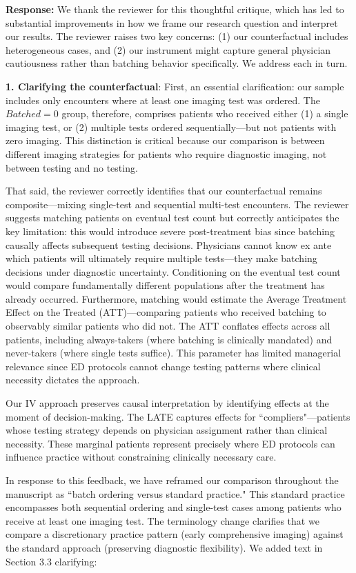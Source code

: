 \documentclass[11pt]{article}
\newcommand{\1}{\hbox{\rm 1\kern-.35em 1}}
\begin{document}
\noindent\textbf{Response:} \color{blue}We thank the reviewer for this thoughtful critique, which has led to substantial improvements in how we frame our research question and interpret our results. The reviewer raises two key concerns: (1) our counterfactual includes heterogeneous cases, and (2) our instrument might capture general physician cautiousness rather than batching behavior specifically. We address each in turn.

\textbf{1. Clarifying the counterfactual}: First, an essential clarification: our sample includes only encounters where at least one imaging test was ordered. The $Batched=0$ group, therefore, comprises patients who received either (1) a single imaging test, or (2) multiple tests ordered sequentially—but not patients with zero imaging. This distinction is critical because our comparison is between different imaging strategies for patients who require diagnostic imaging, not between testing and no testing.

That said, the reviewer correctly identifies that our counterfactual remains composite—mixing single-test and sequential multi-test encounters. The reviewer suggests matching patients on eventual test count but correctly anticipates the key limitation: this would introduce severe post-treatment bias since batching causally affects subsequent testing decisions. Physicians cannot know ex ante which patients will ultimately require multiple tests—they make batching decisions under diagnostic uncertainty. Conditioning on the eventual test count would compare fundamentally different populations after the treatment has already occurred. Furthermore, matching would estimate the Average Treatment Effect on the Treated (ATT)---comparing patients who received batching to observably similar patients who did not. The ATT conflates effects across all patients, including always-takers (where batching is clinically mandated) and never-takers (where single tests suffice). This parameter has limited managerial relevance since ED protocols cannot change testing patterns where clinical necessity dictates the approach.

Our IV approach preserves causal interpretation by identifying effects at the moment of decision-making. The LATE captures effects for ``compliers"—patients whose testing strategy depends on physician assignment rather than clinical necessity. These marginal patients represent precisely where ED protocols can influence practice without constraining clinically necessary care.

In response to this feedback, we have reframed our comparison throughout the manuscript as ``batch ordering versus standard practice." This standard practice encompasses both sequential ordering and single-test cases among patients who receive at least one imaging test. The terminology change clarifies that we compare a discretionary practice pattern (early comprehensive imaging) against the standard approach (preserving diagnostic flexibility). We added text in Section 3.3 clarifying:
\end{document}
